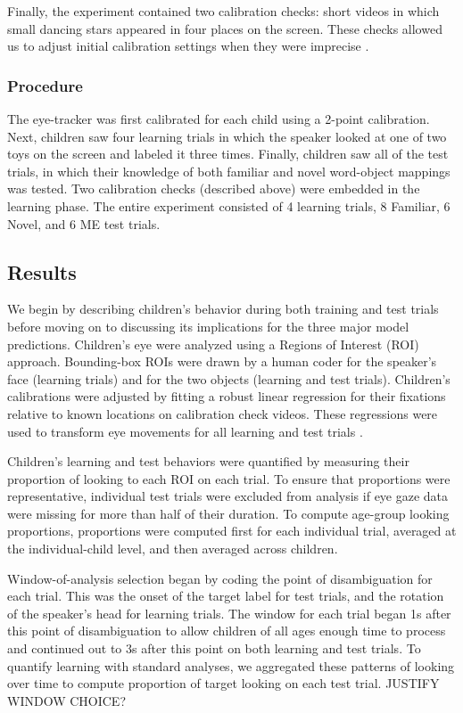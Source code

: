 \documentclass[man,floatsintext]{apa6}
\begin{document}
Finally, the experiment contained two calibration checks: short videos in which small dancing stars appeared in four places on the screen. These checks allowed us to adjust initial calibration settings when they were imprecise \cite<for details, see>{Frank2012d}.

\subsubsection{Procedure}

The eye-tracker was first calibrated for each child using a 2-point calibration. Next, children saw four learning trials in which the speaker looked at one of two toys on the screen and labeled it three times. Finally, children saw all of the test trials, in which their knowledge of both familiar and novel word-object mappings was tested. Two calibration checks (described above) were embedded in the learning phase. The entire experiment consisted of 4 learning trials, 8 Familiar, 6 Novel, and 6 ME test trials.

\subsection{Results}

We begin by describing children's behavior during both training and test trials before moving on to discussing its implications for the three major model predictions. Children's eye were analyzed using a Regions of Interest (ROI) approach. Bounding-box ROIs were drawn by a human coder for the speaker's face (learning trials) and for the two objects (learning and test trials). Children's calibrations were adjusted by fitting a robust linear regression for their fixations relative to known locations on calibration check videos. These regressions were used to transform eye movements for all learning and test trials \cite{Frank2012d}.

Children's learning and test behaviors were quantified by measuring their proportion of looking to each ROI on each trial. To ensure that proportions were representative, individual test trials were excluded from analysis if eye gaze data were missing for more than half of their duration. To compute age-group looking proportions, proportions were computed first for each individual trial, averaged at the individual-child level, and then averaged across children.




Window-of-analysis selection began by coding the point of disambiguation for each trial. This was the onset of the target label for test trials, and the rotation of the speaker's head for learning trials. The window for each trial began 1s after this point of disambiguation to allow children of all ages enough time to process and continued out to 3s after this point on both learning and test trials. To quantify learning with standard analyses, we aggregated these patterns of looking over time to compute proportion of target looking on each test trial. JUSTIFY WINDOW CHOICE?
\end{document}
